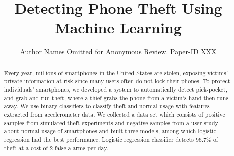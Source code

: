\documentclass[sigconf]{acmart}
\begin{document}
\title{Detecting Phone Theft Using Machine Learning}

\author{Author Names Omitted for Anonymous Review. Paper-ID XXX}

\begin{abstract}
Every year, millions of smartphones in the United States are stolen, exposing victims' private information at risk since many users often do not lock their phones. To protect individuals' smartphones, we developed a system to automatically detect pick-pocket, and grab-and-run theft, where a thief grabs the phone from a victim's hand then runs away. We use binary classifiers to classify theft and normal usage with features extracted from accelerometer data. We collected a data set which consists of positive samples from simulated theft experiments and negative samples from a user study about normal usage of smartphones and built three models, among which logistic regression had the best performance. Logistic regression classifier detects 96.7\% of theft at a cost of 2 false alarms per day.
\end{abstract}





\end{document}
